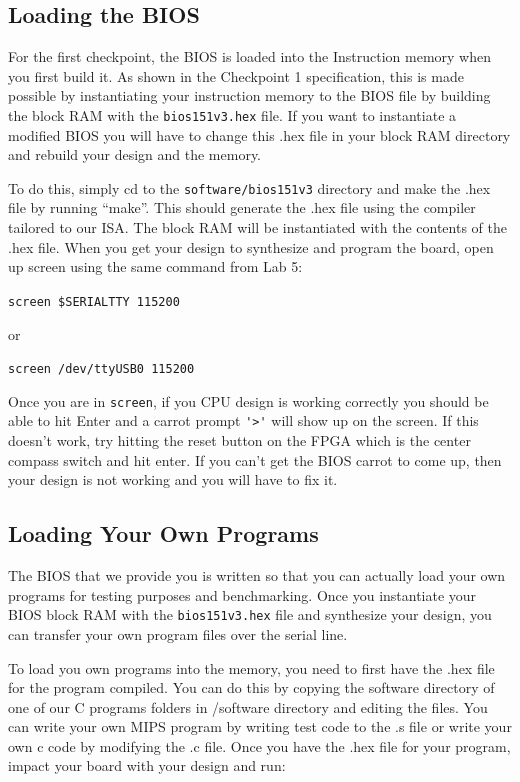 \documentclass[11pt]{article}
\begin{document}
\subsection{Loading the BIOS}
For the first checkpoint, the BIOS is loaded into the Instruction memory when you first build it.
As shown in the Checkpoint 1 specification, this is made possible by instantiating your
instruction memory to the BIOS file by building the block RAM with the \verb|bios151v3.hex| file. If you
want to instantiate a modified BIOS you will have to change this .hex file in your block RAM
directory and rebuild your design and the memory.

To do this, simply cd to the \verb|software/bios151v3| directory and make the .hex file by running
“make”. This should generate the .hex file using the compiler tailored to our ISA. The
block RAM will be instantiated with the contents of the .hex file.
When you get your design to synthesize and program the board, open up screen using the
same command from Lab 5:

\verb|screen $SERIALTTY 115200|

or

\verb|screen /dev/ttyUSB0 115200|

Once you are in \verb|screen|, if you CPU design is working correctly you should be able to hit Enter
and a carrot prompt \verb|'>'| will show up on the screen. If this doesn’t work, try hitting the reset
button on the FPGA which is the center compass switch and hit enter. If you can’t get the BIOS
carrot to come up, then your design is not working and you will have to fix it.

\subsection{Loading Your Own Programs}
The BIOS that we provide you is written so that you can actually load your own programs for
testing purposes and benchmarking. Once you instantiate your BIOS block RAM with the
\verb|bios151v3.hex| file and synthesize your design, you can transfer your own program files over the
serial line.

To load you own programs into the memory, you need to first have the .hex file for the program
compiled. You can do this by copying the software directory of one of our C programs folders in
/software directory and editing the files. You can write your own MIPS program by writing
test code to the .s file or write your own c code by modifying the .c file.
Once you have the .hex file for your program, impact your board with your design and run:
\end{document}
